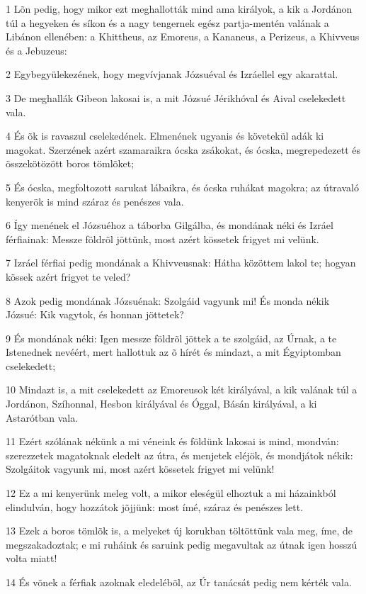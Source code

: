 \par 1 Lõn pedig, hogy mikor ezt meghallották mind ama királyok, a kik a Jordánon túl a hegyeken és síkon és a nagy tengernek egész partja-mentén valának a Libánon ellenében: a Khittheus, az Emoreus, a Kananeus, a Perizeus, a Khivveus és a Jebuzeus:
\par 2 Egybegyülekezének, hogy megvívjanak Józsuéval és Izráellel egy akarattal.
\par 3 De meghallák Gibeon lakosai is, a mit Józsué Jérikhóval és  Aival cselekedett vala.
\par 4 És õk is ravaszul cselekedének. Elmenének ugyanis és követekül adák ki magokat. Szerzének azért szamaraikra ócska zsákokat, és ócska, megrepedezett és összekötözött boros tömlõket;
\par 5 És ócska, megfoltozott sarukat lábaikra, és ócska ruhákat magokra; az útravaló kenyerök is mind száraz és penészes vala.
\par 6 Így menének el Józsuéhoz a táborba Gilgálba, és mondának néki és Izráel férfiainak: Messze földrõl jöttünk, most azért kössetek frigyet mi velünk.
\par 7 Izráel férfiai pedig mondának a Khivveusnak: Hátha közöttem lakol te; hogyan kössek azért frigyet te veled?
\par 8 Azok pedig mondának Józsuénak: Szolgáid vagyunk mi! És monda nékik Józsué: Kik vagytok, és honnan jöttetek?
\par 9 És mondának néki: Igen messze földrõl jöttek a te szolgáid, az Úrnak, a te Istenednek nevéért, mert hallottuk az õ hírét és mindazt, a mit Égyiptomban cselekedett;
\par 10 Mindazt is, a mit cselekedett az Emoreusok két királyával, a kik valának túl a Jordánon, Szíhonnal, Hesbon királyával és Óggal, Básán királyával, a ki Astarótban vala.
\par 11 Ezért szólának nékünk a mi véneink és földünk lakosai is mind, mondván: szerezzetek magatoknak eledelt az útra, és menjetek eléjök, és mondjátok nékik: Szolgáitok vagyunk mi, most azért kössetek frigyet mi velünk!
\par 12 Ez a mi kenyerünk meleg volt, a mikor eleségül elhoztuk a mi házainkból elindulván, hogy hozzátok jõjjünk: most ímé, száraz és penészes lett.
\par 13 Ezek a boros tömlõk is, a melyeket új korukban töltöttünk vala meg, íme, de megszakadoztak; e mi ruháink és saruink pedig megavultak az útnak igen hosszú volta miatt!
\par 14 És võnek a férfiak azoknak eledelébõl, az Úr tanácsát pedig nem kérték vala.
